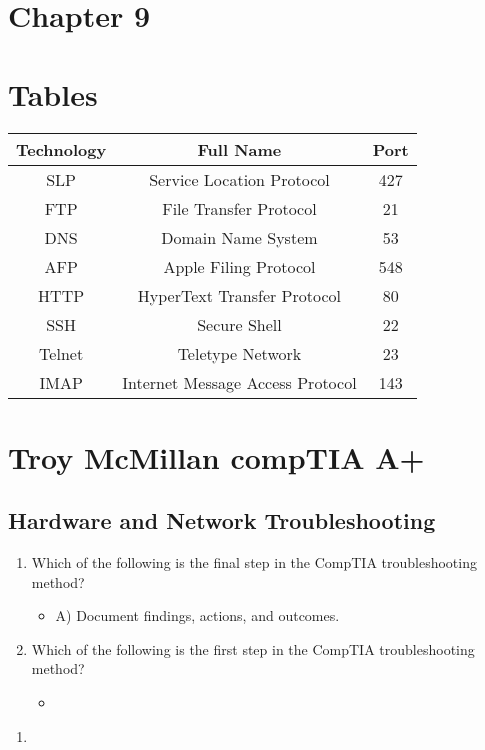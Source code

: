 \documentclass{article}
\begin{document}
\section{Chapter 9}
\section{Tables}
\begin{tabular}{|c|c|c|}
\hline
    Technology & Full Name & Port \\
    \hline
   SLP  & Service Location Protocol & 427\\
   FTP & File Transfer Protocol & 21 \\
   DNS & Domain Name System & 53\\
   AFP & Apple Filing Protocol & 548 \\
   HTTP & HyperText Transfer Protocol & 80 \\
   SSH & Secure Shell & 22 \\
   Telnet & Teletype Network & 23\\
   IMAP & Internet Message Access Protocol & 143\\
   \hline
\end{tabular}



\section{Troy McMillan compTIA A+} 
\subsection{Hardware and Network Troubleshooting}
\begin{enumerate}
    \item Which of the following is the final step in the CompTIA troubleshooting method?
    \begin{itemize}
        \item A) Document findings, actions, and outcomes.
    \end{itemize}
    \item Which of the following is the first step in the CompTIA troubleshooting method?
    \begin{itemize}
        \item 
    \end{itemize}
\end{enumerate}
\begin{enumerate}
    \item 
\end{enumerate}
\end{document}
